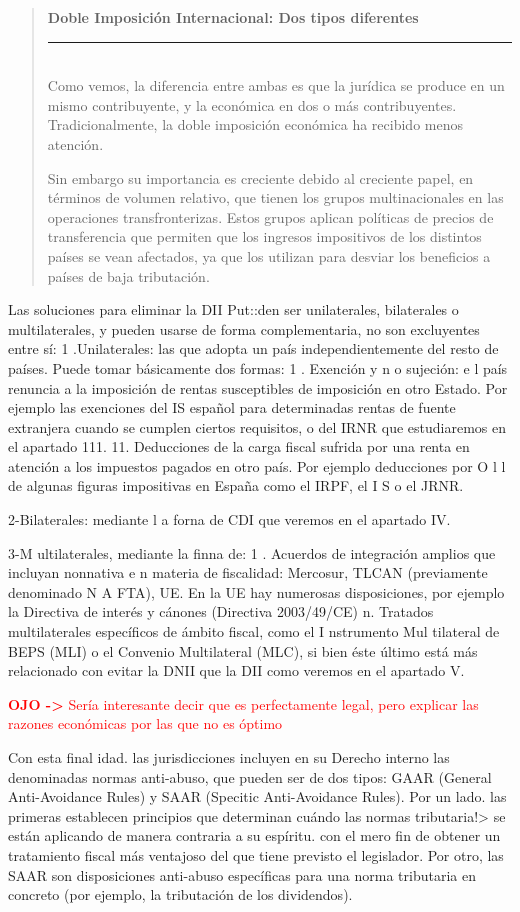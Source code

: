 \documentclass[10pt,a4paper]{article}
\newenvironment{specialblock}[1]{%
      \begin{quote} %
      \small %
      \noindent\textbf{#1}\\[-0.3em] %
      \rule{\linewidth}{0.4pt}\\[0.6em]}{
      \end{quote}}
\begin{document}
\begin{specialblock}{Doble Imposición Internacional: Dos tipos diferentes}
    Como vemos, la diferencia entre ambas es que la jurídica se produce en un mismo contribuyente, y la económica en dos o más contribuyentes. Tradicionalmente, la doble imposición económica ha recibido menos atención.
    
    Sin embargo su importancia es creciente debido al creciente papel, en términos de volumen relativo, que tienen los grupos multinacionales en las operaciones transfronterizas. Estos grupos aplican políticas de precios de transferencia que permiten que los ingresos impositivos de los distintos países se vean afectados, ya que los utilizan para desviar los beneficios a países de baja tributación.

    
\end{specialblock}

Las soluciones para eliminar la DII
Put::den ser unilaterales, bilaterales o multilaterales, y pueden usarse de forma complementaria, no son excluyentes entre sí:
1 .Unilaterales: las que adopta un país independientemente del resto de países. Puede tomar básicamente dos formas:
1 . Exención y n o sujeción: e l país renuncia a la imposición de rentas susceptibles de imposición en otro Estado. Por ejemplo las exenciones del IS español para determinadas rentas de fuente extranjera cuando se cumplen ciertos requisitos, o del IRNR que estudiaremos en el apartado 111.
11. Deducciones de la carga fiscal sufrida por una renta en atención a los impuestos pagados en otro país. Por ejemplo deducciones por O l l de algunas figuras impositivas en España como el IRPF, el I S o el JRNR.

2-Bilaterales: mediante l a forna de CDI que veremos en el apartado IV.

3-M ultilaterales, mediante la finna de:
1 . Acuerdos de integración amplios que incluyan nonnativa e n materia de fiscalidad: Mercosur, TLCAN (previamente denominado N A FTA), UE. En la UE hay numerosas disposiciones, por ejemplo la Directiva de interés y cánones (Directiva 2003/49/CE)
n. Tratados multilaterales específicos de ámbito fiscal, como el I nstrumento Mul tilateral de BEPS (MLI) o el Convenio Multilateral (MLC), si bien éste último está más relacionado con evitar la DNII que la DII como veremos en el apartado V.


\textcolor{red}{\textbf{OJO ->} Sería interesante decir que es perfectamente legal, pero explicar las razones económicas por las que no es óptimo}

Con esta final idad. las jurisdicciones incluyen en su Derecho interno las denominadas normas anti-abuso, que pueden ser de dos tipos: GAAR (General Anti-Avoidance Rules) y SAAR (Specitic Anti-Avoidance Rules). Por un lado. las primeras establecen principios que determinan cuándo las normas tributaria!> se están aplicando de manera contraria a su espíritu. con el mero fin de obtener un tratamiento fiscal más ventajoso del que tiene previsto el legislador. Por otro, las SAAR son disposiciones anti-abuso específicas para una norma tributaria en concreto (por ejemplo, la tributación de los dividendos).
\end{document}
